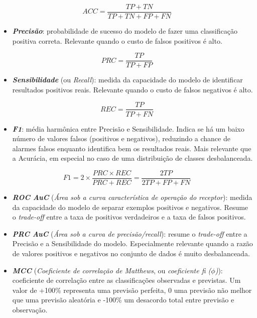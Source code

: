 \documentclass[]{article}
\begin{document}
\[ACC = \frac{TP + TN}{TP + TN + FP + FN}\]

\begin{itemize}
\item
  \textbf{\emph{Precisão}}: probabilidade de sucesso do modelo de fazer
  uma classificação positiva correta. Relevante quando o custo de falsos
  positivos é alto.
\end{itemize}

\[PRC = \frac{TP}{TP + FP}\]

\begin{itemize}
\item
  \textbf{\emph{Sensibilidade}} (ou \emph{Recall}): medida da capacidade
  do modelo de identificar resultados positivos reais. Relevante quando
  o custo de falsos negativos é alto.
\end{itemize}

\[REC = \frac{TP}{TP + FN}\]

\begin{itemize}
\item
  \textbf{\emph{F1}}: média harmônica entre Precisão e Sensibilidade.
  Indica se há um baixo número de valores falsos (positivos e
  negativos), reduzindo a chance de alarmes falsos enquanto identifica
  bem os resultados reais. Mais relevante que a Acurácia, em especial no
  caso de uma distribuição de classes desbalanceada.
\end{itemize}

\[F1 =  2×\frac{PRC × REC}{PRC + REC}   = \frac{2TP}{2TP + FP + FN}\]

\begin{itemize}
\item
  \textbf{\emph{ROC AuC}} (\emph{Área sob a curva característica de
  operação do receptor}): medida da capacidade do modelo de separar
  exemplos positivos e negativos. Resume o \emph{trade-off} entre a taxa
  de positivos verdadeiros e a taxa de falsos positivos.
\item
  \textbf{\emph{PRC AuC}} (\emph{Área sob a curva de precisão/recall}):
  resume o \emph{trade-off} entre a Precisão e a Sensibilidade do
  modelo. Especialmente relevante quando a razão de valores positivos e
  negativos no conjunto de dados é muito desbalanceada.
\item
  \textbf{\emph{MCC}} (\emph{Coeficiente de correlação de Matthews}, ou
  \emph{coeficiente fi (\(\phi\))}): coeficiente de correlação entre as
  classificações observadas e previstas. Um valor de +100\% representa
  uma previsão perfeita, 0 uma previsão não melhor que uma previsão
  aleatória e -100\% um desacordo total entre previsão e observação. 
\end{itemize}
\end{document}
